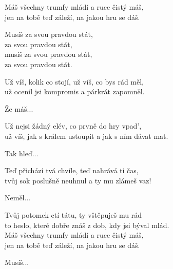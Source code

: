 
\ve{}
Máš všechny trumfy mládí a ruce čistý máš,\\
jen na tobě teď záleží, na jakou hru se dáš.

\cho{}
Musíš za svou pravdou stát,\\
za svou pravdou stát,\\
musíš za svou pravdou stát,\\
za svou pravdou stát.

\ve{}
Už víš, kolik co stojí, už víš, co bys rád měl,\\
už ocenil jsi kompromis a párkrát zapomněl.

\cho{}
Že máš...

\ve{}
Už nejsi žádný elév, co prvně do hry vpad',\\
už víš, jak s králem ustoupit a jak s ním dávat mat.

\cho{}
Tak hleď...

\ve{}
Teď přichází tvá chvíle, teď nahrává ti čas,\\
tvůj sok poslušně neuhnul a ty mu zlámeš vaz!

\cho{}
Neměl...

\ve{}
Tvůj potomek ctí tátu, ty vštěpuješ mu rád\\
to heslo, které dobře znáš z dob, kdy jsi býval mlád.\\
Máš všechny trumfy mládí a ruce čistý máš,\\
jen na tobě teď záleží, na jakou hru se dáš.

\cho{}
Musíš...

\esong
